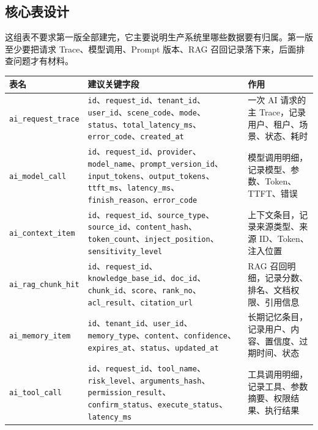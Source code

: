\documentclass[9pt,a4paper,twocolumn]{ctexart}
\begin{document}
\subsection*{核心表设计}


这组表不要求第一版全部建完，它主要说明生产系统里哪些数据要有归属。第一版至少要把请求 Trace、模型调用、Prompt 版本、RAG 召回记录落下来，后面排查问题才有材料。


{\footnotesize
\begin{tabular}{|p{}|p{}|p{}|}
\hline
\textbf{表名} & \textbf{建议关键字段} & \textbf{作用} \\
\hline
\texttt{ai\_request\_trace} & \texttt{id}、\texttt{request\_id}、\texttt{tenant\_id}、\texttt{user\_id}、\texttt{scene\_code}、\texttt{mode}、\texttt{status}、\texttt{total\_latency\_ms}、\texttt{error\_code}、\texttt{created\_at} & 一次 AI 请求的主 Trace，记录用户、租户、场景、状态、耗时 \\
\hline
\texttt{ai\_model\_call} & \texttt{id}、\texttt{request\_id}、\texttt{provider}、\texttt{model\_name}、\texttt{prompt\_version\_id}、\texttt{input\_tokens}、\texttt{output\_tokens}、\texttt{ttft\_ms}、\texttt{latency\_ms}、\texttt{finish\_reason}、\texttt{error\_code} & 模型调用明细，记录模型、参数、Token、TTFT、错误 \\
\hline
\texttt{ai\_context\_item} & \texttt{id}、\texttt{request\_id}、\texttt{source\_type}、\texttt{source\_id}、\texttt{content\_hash}、\texttt{token\_count}、\texttt{inject\_position}、\texttt{sensitivity\_level} & 上下文条目，记录来源类型、来源 ID、Token、注入位置 \\
\hline
\texttt{ai\_rag\_chunk\_hit} & \texttt{id}、\texttt{request\_id}、\texttt{knowledge\_base\_id}、\texttt{doc\_id}、\texttt{chunk\_id}、\texttt{score}、\texttt{rank\_no}、\texttt{acl\_result}、\texttt{citation\_url} & RAG 召回明细，记录分数、排名、文档权限、引用信息 \\
\hline
\texttt{ai\_memory\_item} & \texttt{id}、\texttt{tenant\_id}、\texttt{user\_id}、\texttt{memory\_type}、\texttt{content}、\texttt{confidence}、\texttt{expires\_at}、\texttt{status}、\texttt{updated\_at} & 长期记忆条目，记录用户、内容、置信度、过期时间、状态 \\
\hline
\texttt{ai\_tool\_call} & \texttt{id}、\texttt{request\_id}、\texttt{tool\_name}、\texttt{risk\_level}、\texttt{arguments\_hash}、\texttt{permission\_result}、\texttt{confirm\_status}、\texttt{execute\_status}、\texttt{latency\_ms} & 工具调用明细，记录工具、参数摘要、权限结果、执行结果 \\

\end{tabular}}
\end{document}
